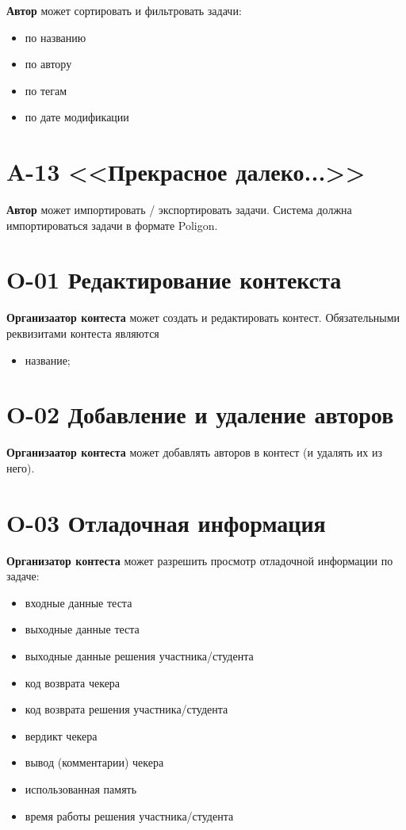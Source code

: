 \documentclass{book}
\begin{document}
\textbf{Автор} может сортировать и фильтровать задачи:
\begin{itemize}\setlength{\itemsep}{0pt}
	\item по названию
	\item по автору
	\item по тегам
	\item по дате модификации 
\end{itemize}

\newpage \section*{A-13 <<Прекрасное далеко...>>}
\textbf{Автор} может импортировать / экспортировать задачи. Система должна импортироваться задачи в формате Poligon.



\newpage \section*{O-01 Редактирование контекста}
\textbf{Организаатор контеста} может создать и редактировать контест.
Обязательными реквизитами контеста являются
\begin{itemize}\setlength{\itemsep}{0pt}
	\item название;
\end{itemize}

\newpage \section*{O-02 Добавление и удаление авторов}
\textbf{Организаатор контеста} может добавлять авторов в контест (и удалять их из него).

\newpage \section*{O-03 Отладочная информация}
\textbf{Организатор контеста} может разрешить просмотр отладочной информации по задаче:
\begin{itemize}\setlength{\itemsep}{0pt}
	\item входные данные теста
	\item выходные данные теста
	\item выходные данные решения участника/студента
	\item код возврата чекера
	\item код возврата решения участника/студента
	\item вердикт чекера
	\item вывод (комментарии) чекера
	\item использованная память
	\item время работы решения участника/студента
\end{itemize}
\end{document}
